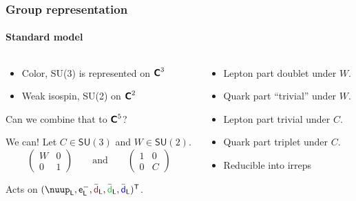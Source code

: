 \documentclass[english, fleqn]{beamer}
\newcommand\qqandqq{\qquad\text{and}\qquad}
\begin{document}
\begin{frame}
    \frametitle{Group representation}
    \framesubtitle{Standard model}

    \begin{columns}[t]
        \begin{column}{.55\textwidth}

            \begin{itemize}
                \item Color, SU(3) is represented on $\text{\bfseries\sffamily{C}}^3$
                \item Weak isospin, SU(2) on $\text{\bfseries\sffamily{C}}^2$
            \end{itemize}

            Can we combine that to $\text{\bfseries\sffamily{C}}^5$?

            \pause

            We can! Let $C \in \mathsf{SU}(3)$ and $W \in \mathsf{SU}(2)$.
            \pause
            \[
                \begin{pmatrix}
                    W & 0 \\
                    0 & 1
                \end{pmatrix}
                \qqandqq
                \begin{pmatrix}
                    1 & 0 \\
                    0 & C
                \end{pmatrix}
            \]

            Acts on $(\nuup_\mathsf L, \mathsf e^-_\mathsf L,
            \bar{\textcolor{qred}{\mathsf d}}_\mathsf L,
            \bar{\textcolor{qgreen}{\mathsf d}}_\mathsf L,
            \bar{\textcolor{qblue}{\mathsf d}}_\mathsf L)^\mathsf T$.
        \end{column}
        \pause
        \begin{column}{.45\textwidth}
            \begin{itemize}
                \item Lepton part doublet under $W$.
                \item Quark part \enquote{trivial} under $W$.
                \item Lepton part trivial under $C$.
                \item Quark part triplet under $C$.
                \item Reducible into irreps
            \end{itemize}
        \end{column}
    \end{columns}
\end{frame}
\end{document}
